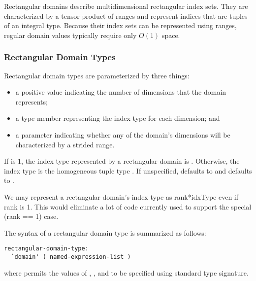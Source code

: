 Rectangular domains describe multidimensional rectangular index sets.  They are
characterized by a tensor product of ranges and represent indices that are
tuples of an integral type.  Because their index sets can be represented using
ranges, regular domain values typically require only $O(1)$ space.

\subsubsection{Rectangular Domain Types}

Rectangular domain types are parameterized by three things:
\begin{itemize}
\item {} a positive  value indicating the number
of dimensions that the domain represents;
\item {} a type member representing the index type for
each dimension; and
\item {} a  parameter indicating whether
any of the domain's dimensions will be characterized by a strided
range.
\end{itemize}
If  is $1$, the index type represented by a rectangular
domain is .  Otherwise, the index type is the homogeneous
tuple type .
If unspecified,  defaults
to  and  defaults to .

\begin{openissue}
We may represent a rectangular domain's index type as rank*idxType even if rank is 1.  This
would eliminate a lot of code currently used to support the special (rank == 1) case.
\end{openissue}

The syntax of a rectangular domain type is summarized as follows:
\begin{syntax}
\begin{verbatim}
rectangular-domain-type:
  `domain' ( named-expression-list )
\end{verbatim}
\end{syntax}

\noindent where  permits the values of
, , and  to be specified
using standard type signature.

